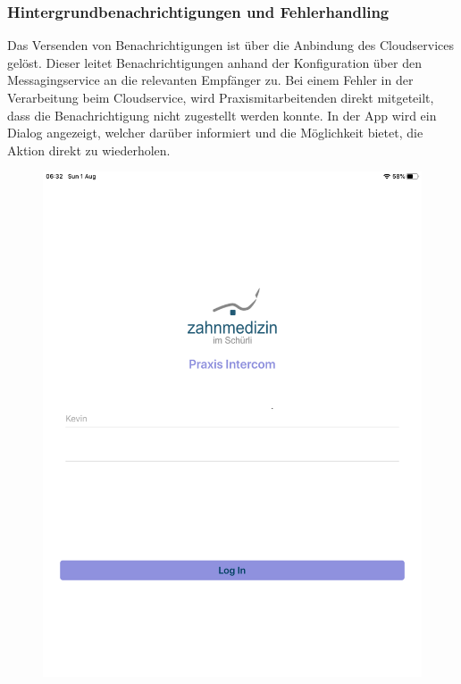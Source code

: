 \clearpage

\subsubsection*{Hintergrundbenachrichtigungen und Fehlerhandling}

Das Versenden von Benachrichtigungen ist über die Anbindung des Cloudservices gelöst.
Dieser leitet Benachrichtigungen anhand der Konfiguration über den Messagingservice an die relevanten Empfänger zu.
Bei einem Fehler in der Verarbeitung beim Cloudservice, wird Praxismitarbeitenden direkt mitgeteilt, dass die Benachrichtigung nicht zugestellt werden konnte.
In der App wird ein Dialog angezeigt, welcher darüber informiert und die Möglichkeit bietet, die Aktion direkt zu wiederholen.

\begin{figure}[h]
    \centering
    \begin{minipage}[b]{0.4\textwidth}
        \includegraphics[width=\textwidth]{graphics/screenshots/placeholder}

\end{minipage}
\end{figure}
